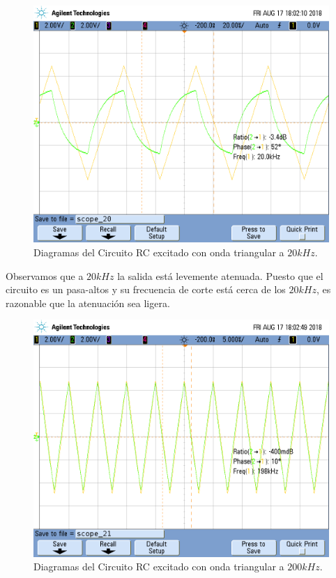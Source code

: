 \begin{figure}[H]
\centering
\includegraphics[scale=0.3]{2_20k.png}
\caption{Diagramas del Circuito RC excitado con onda triangular a $20kHz$.}
\label{fig:CR}
\end{figure}

Observamos que a $20kHz$ la salida está levemente atenuada. Puesto que el circuito es un pasa-altos y su frecuencia de corte está cerca de los $20kHz$, es razonable que la atenuación sea ligera.

\begin{figure}[H]
\centering
\includegraphics[scale=0.3]{2_198k.png}
\caption{Diagramas del Circuito RC excitado con onda triangular a $200kHz$.}
\label{fig:CR}
\end{figure}

